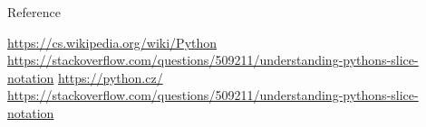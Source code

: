 \documentclass[10pt]{beamer}
\begin{document}
\begin{frame}{Reference}
    \begin{thebibliography}{Mm99}
         \url{https://cs.wikipedia.org/wiki/Python}
         \url{https://stackoverflow.com/questions/509211/understanding-pythons-slice-notation}   
         \url{https://python.cz/}
         \url{https://stackoverflow.com/questions/509211/understanding-pythons-slice-notation}
         \url{}
    \end{thebibliography}
\end{frame}
\end{document}
